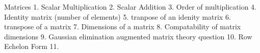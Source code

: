 Matrices
1. Scalar Multiplication
2. Scalar Addition
3. Order of multiplication
4. Identity matrix (number of elements)
5. tranpose of an idenity matrix
6. transpose of a matrix
7. Dimensions of a matrix
8. Compatability of matrix dimensions
9. Gaussian elimination augmented matrix theory question
10. Row Echelon Form
11. 

